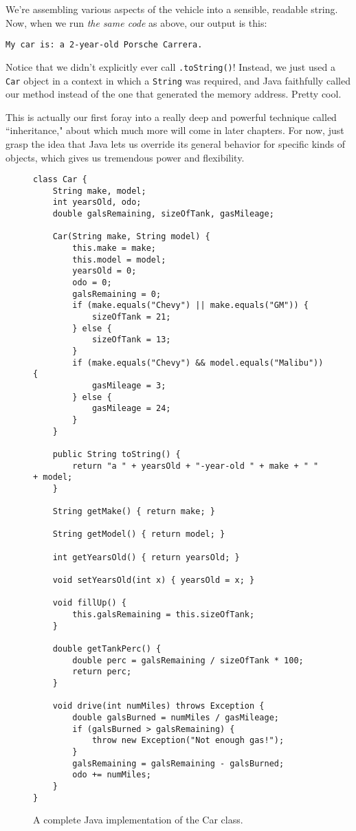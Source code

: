We're assembling various aspects of the vehicle into a sensible, readable
string. Now, when we run \textit{the same code} as above, our output is this:

\begin{verbatim}
My car is: a 2-year-old Porsche Carrera.
\end{verbatim}

Notice that we didn't explicitly ever call \texttt{.toString()}! Instead, we
just used a \texttt{Car} object in a context in which a \texttt{String} was
required, and Java faithfully called our method instead of the one that
generated the memory address. Pretty cool.

This is actually our first foray into a really deep and powerful technique
called ``inheritance," about which much more will come in later chapters. For
now, just grasp the idea that Java lets us override its general behavior for
specific kinds of objects, which gives us tremendous power and flexibility.

\begin{figure}
\begin{Verbatim}[fontsize=\scriptsize,frame=single]
class Car {
    String make, model;
    int yearsOld, odo;
    double galsRemaining, sizeOfTank, gasMileage;

    Car(String make, String model) {
        this.make = make;
        this.model = model;
        yearsOld = 0;
        odo = 0;
        galsRemaining = 0;
        if (make.equals("Chevy") || make.equals("GM")) {
            sizeOfTank = 21;
        } else {
            sizeOfTank = 13;
        }
        if (make.equals("Chevy") && model.equals("Malibu")) {
            gasMileage = 3;
        } else {
            gasMileage = 24;
        }
    }

    public String toString() {
        return "a " + yearsOld + "-year-old " + make + " " + model;
    }

    String getMake() { return make; }

    String getModel() { return model; }

    int getYearsOld() { return yearsOld; }

    void setYearsOld(int x) { yearsOld = x; }

    void fillUp() {
        this.galsRemaining = this.sizeOfTank;
    }

    double getTankPerc() {
        double perc = galsRemaining / sizeOfTank * 100;
        return perc;
    }

    void drive(int numMiles) throws Exception {
        double galsBurned = numMiles / gasMileage;
        if (galsBurned > galsRemaining) {
            throw new Exception("Not enough gas!");
        }
        galsRemaining = galsRemaining - galsBurned;
        odo += numMiles;
    }
}
\end{Verbatim}
\caption{A complete Java implementation of the Car class.}
\label{fig:carClassCode}
\end{figure}



